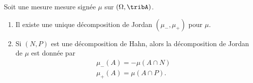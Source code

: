 \begin{proposition}		\label{DEFooDYFPooITNRlI}
	Soit une mesure mesure signée \( \mu\) sur \( (\Omega,\tribA)\).
	\begin{enumerate}
		\item
		      Il existe une unique décomposition de Jordan \( (\mu_-, \mu_+)\) pour \( \mu\).
		\item		\label{ITEMooDMVXooTXBFnM}
		      Si \( (N,P)\) est une décomposition de Hahn, alors la décomposition de Jordan de \( \mu\) est donnée par
		      \begin{subequations}
			      \begin{align}
				      \mu_-(A)=-\mu(A\cap N) \\
				      \mu_+(A)=\mu(A\cap P).
			      \end{align}
		      \end{subequations}
	\end{enumerate}
\end{proposition}

